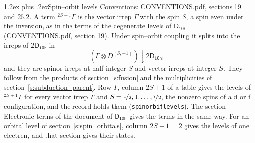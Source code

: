 \documentclass[10pt,a4paper]{article}
\makeatletter
\renewcommand\section{\@startsection{section}{1}{\z@}{-3ex plus -1ex minus -.2ex}%
  {1.2ex plus .2ex}{\normalfont\large\sffamily\bfseries\color{parttitle}}}
\numberwithin{equation}{section}
\newcommand{\grp}[1]{\mathsf{#1}}
\newcommand{\restr}[2]{#1\!\downarrow#2}
\newcommand{\irrJp}[2]{D^{(#1,#2)}}
\newcommand{\irrprod}{\otimes}
\newcommand{\term}[2]{{}^{#1}#2}
\makeatother
\begin{document}
\section{Spin--orbit levels}\label{s:spin_orbit}
Conventions: \href{../../CONVENTIONS.pdf}{CONVENTIONS.pdf}, sections \href{../../../rotation/CONVENTIONS.pdf\#conv.19}{19} and \href{../../CONVENTIONS.pdf\#conv.25.2}{25.2}.
\leavevmode\label{n:local.spin}\label{n:symbol.term}A term $\term{2S+1}{\Gamma}$ is the vector irrep $\Gamma$ with the spin $S$, a spin even under the inversion, as in the terms of the degenerate levels of \href{../../../rotation/data/pdf/D10h.pdf}{$\grp{D_{10h}}$} (\href{../../CONVENTIONS.pdf}{CONVENTIONS.pdf}, section \href{../../../rotation/CONVENTIONS.pdf\#conv.19}{19}). Under spin--orbit coupling it splits into the irreps of $\grp{2D_{10h}}$ in
\begin{equation}\label{e:spinorbit}\restr{(\Gamma \irrprod \irrJp{S}{+1})}{\grp{2D_{10h}}},\end{equation}
and they are spinor irreps at half-integer $S$ and vector irreps at integer $S$. They follow from the products of section~\ref{s:fusion} and the multiplicities of section~\ref{s:subduction_parent}. Row $\Gamma$, column $2S + 1$ of a table gives the levels of $\term{2S+1}{\Gamma}$ for every vector irrep $\Gamma$ and $S = \nicefrac{1}{2}, 1, \dots, \nicefrac{7}{2}$, the nonzero spins of a d or f configuration, and the record holds them (\texttt{spinorbitlevels}). The section Electronic terms of the document of \href{../../../rotation/data/pdf/D10h.pdf}{$\grp{D_{10h}}$} gives the terms in the same way. For an orbital level of section~\ref{s:spin_orbitals}, column $2S + 1 = 2$ gives the levels of one electron, and that section gives their states.
\end{document}

